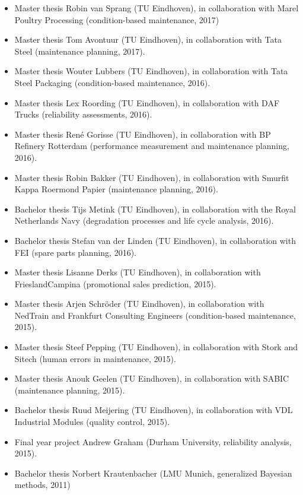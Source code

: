 \documentclass[a4paper]{simplecv}
\begin{document}
\begin{itemize}
\item Master thesis Robin van Sprang (TU Eindhoven),
in collaboration with Marel Poultry Processing (condition-based maintenance, 2017)
\item Master thesis Tom Avontuur (TU Eindhoven),
in collaboration with Tata Steel (maintenance planning, 2017).
\item Master thesis Wouter Lubbers (TU Eindhoven),
in collaboration with Tata Steel Packaging (condition-based maintenance, 2016).
\item Master thesis Lex Roording (TU Eindhoven),
in collaboration with DAF Trucks (reliability assessments, 2016).
\item Master thesis Ren\'{e} Gorisse (TU Eindhoven),
in collaboration with BP Refinery Rotterdam (performance measurement and maintenance planning, 2016).
\item Master thesis Robin Bakker (TU Eindhoven),
in collaboration with Smurfit Kappa Roermond Papier (maintenance planning, 2016).
\item Bachelor thesis Tijs Metink (TU Eindhoven),
in collaboration with the Royal Netherlands Navy (degradation processes and life cycle analysis, 2016).
\item Bachelor thesis Stefan van der Linden (TU Eindhoven),
in collaboration with FEI (spare parts planning, 2016).
\item Master thesis Lisanne Derks (TU Eindhoven),
in collaboration with FrieslandCampina (promotional sales prediction, 2015).
\item Master thesis Arjen Schr\"{o}der (TU Eindhoven),
in collaboration with NedTrain and Frankfurt Consulting Engineers (condition-based maintenance, 2015).
\item Master thesis Steef Pepping (TU Eindhoven),
in collaboration with Stork and Sitech (human errors in maintenance, 2015).
\item Master thesis Anouk Geelen (TU Eindhoven),
in collaboration with SABIC (maintenance planning, 2015).
\item Bachelor thesis Ruud Meijering (TU Eindhoven),
in collaboration with VDL Industrial Modules (quality control, 2015).
\item Final year project Andrew Graham (Durham University, reliability analysis, 2015).
\item Bachelor thesis Norbert Krautenbacher (LMU Munich, generalized Bayesian methods, 2011)
\end{itemize}
\end{document}

